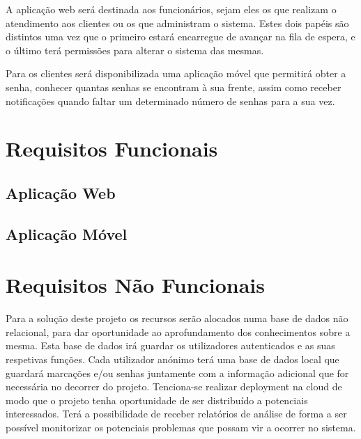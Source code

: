 \documentclass[12pt,a4paper]{article}
\begin{document}
A aplicação web será destinada aos funcionários, sejam eles os que realizam o atendimento aos
clientes ou os que administram o sistema. Estes dois papéis são distintos uma vez que o primeiro estará
encarregue de avançar na fila de espera, e o último terá permissões para alterar o sistema das mesmas.

Para os clientes será disponibilizada uma aplicação móvel que permitirá obter a senha, conhecer
quantas senhas se encontram à sua frente, assim como receber notificações quando faltar um
determinado número de senhas para a sua vez.

\pagebreak
\section{Requisitos Funcionais}
\subsection{Aplicação Web}
\subsection{Aplicação Móvel}

\pagebreak
\section{Requisitos Não Funcionais}
Para a solução deste projeto os recursos serão alocados numa base de dados não relacional, para dar
oportunidade ao aprofundamento dos conhecimentos sobre a mesma. Esta base de dados irá guardar os
utilizadores autenticados e as suas respetivas funções. Cada utilizador anónimo terá uma base de dados
local que guardará marcações e/ou senhas juntamente com a informação adicional que for necessária
no decorrer do projeto.
Tenciona-se realizar deployment na cloud de modo que o projeto tenha oportunidade de ser
distribuído a potenciais interessados. Terá a possibilidade de receber relatórios de análise de forma a
ser possível monitorizar os potenciais problemas que possam vir a ocorrer no sistema.
\end{document}
